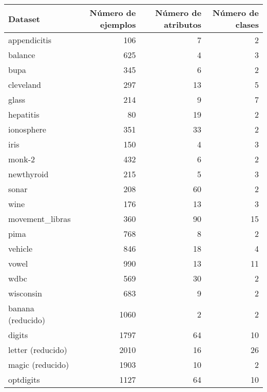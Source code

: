 \begin{tabular}{lrrr}
\toprule
Dataset              &  Número de ejemplos & Número de atributos & Número de clases \\
\midrule
appendicitis              &    106      &    7       &   2    \\
balance                   &    625      &    4       &   3    \\
bupa                      &    345      &    6       &   2    \\
cleveland                 &    297      &    13       &  5     \\
glass                     &    214      &    9       &   7    \\
hepatitis                 &    80      &     19      &   2    \\
ionosphere                &    351      &    33       &   2    \\
iris                      &    150      &    4       &    3   \\
monk-2                    &    432      &    6       &    2   \\
newthyroid                &    215      &    5       &    3   \\
sonar                     &    208      &    60       &   2    \\
wine                      &    176      &    13       &   3    \\
movement\_libras          &    360      &    90       &   15    \\
pima                      &    768      &     8      &    2   \\
vehicle                   &    846      &    18       &   4    \\
vowel                     &    990      &    13       &   11    \\
wdbc                      &    569      &    30       &   2    \\
wisconsin                 &    683      &     9      &    2   \\
banana (reducido)         &    1060      &    2       &   2    \\
digits                    &    1797      &    64       &  10     \\
letter (reducido)         &    2010      &    16       &  26     \\
magic  (reducido)         &    1903      &    10       &  2     \\
optdigits                 &    1127      &    64       &  10     \\

\end{tabular}
